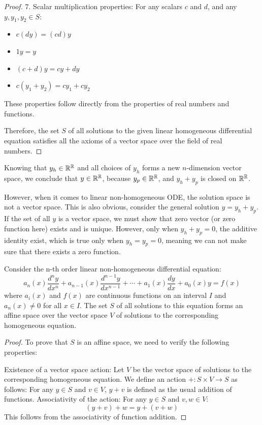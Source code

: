 \documentclass[12pt,a4paper]{article}
\begin{document}
\begin{remark}
\begin{proof}
7. Scalar multiplication properties: For any scalars $c$ and $d$, and any $y, y_1, y_2 \in S$:
   \begin{itemize}
   \item $c(dy) = (cd)y$
   \item $1y = y$
   \item $(c+d)y = cy + dy$
   \item $c(y_1 + y_2) = cy_1 + cy_2$
   \end{itemize}
   These properties follow directly from the properties of real numbers and functions.

Therefore, the set $S$ of all solutions to the given linear homogeneous differential equation satisfies all the axioms of a vector space over the field of real numbers.
\end{proof}

Knowing that $y_h\in \mathbb{R}^{\mathbb{R}}$ and all choices of $y_h$ forms a new $n$-dimension vector space, we conclude that $y\in \mathbb{R}^{\mathbb{R}}$, because $y_p \in \mathbb{R}^{\mathbb{R}}$, and $y_h+y_p$ is closed on $\mathbb{R}^{\mathbb{R}}$.

However, when it comes to linear non-homogeneous ODE, the solution space is not a vector space. This is also obvious, consider the general solution $y = y_h+y_p$. If the set of all $y$ is a vector space, we must show that zero vector (or zero function here) exists and is unique. However, only when $y_h+y_p = 0$, the additive identity exist, which is true only when $y_h=y_p=0$, meaning we can not make sure that there exists a zero function.
\begin{proposition}
Consider the n-th order linear non-homogeneous differential equation:
\[
a_n(x)\frac{d^ny}{dx^n} + a_{n-1}(x)\frac{d^{n-1}y}{dx^{n-1}} + \cdots + a_1(x)\frac{dy}{dx} + a_0(x)y = f(x)
\]
where $a_i(x)$ and $f(x)$ are continuous functions on an interval $I$ and $a_n(x) \neq 0$ for all $x \in I$.
The set $S$ of all solutions to this equation forms an affine space over the vector space $V$ of solutions to the corresponding homogeneous equation.
\end{proposition}
\begin{proof}
To prove that $S$ is an affine space, we need to verify the following properties:

Existence of a vector space action: Let $V$ be the vector space of solutions to the corresponding homogeneous equation. We define an action $+: S \times V \to S$ as follows:
For any $y \in S$ and $v \in V$, $y + v$ is defined as the usual addition of functions.
Associativity of the action: For any $y \in S$ and $v, w \in V$:
\[
(y + v) + w = y + (v + w)
\]
This follows from the associativity of function addition.


\end{proof}
\end{remark}
\end{document}
